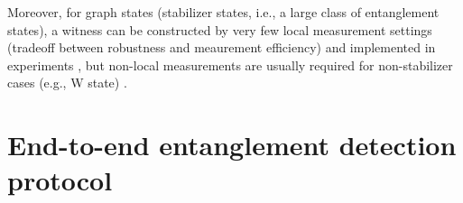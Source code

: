 \documentclass[
aps,
pra,
twocolumn,
floatfix,
]{revtex4-2}
\theoremstyle{plain}
\theoremstyle{definition}
\newcommand{\ew}{W}
\newcommand{\ghz}{\text{GHZ}}
\newcommand{\px}{X}
\newcommand{\pz}{Z}
\begin{document}
Moreover, for graph states (stabilizer states, i.e., a large class of entanglement states),
a witness can be constructed by very few local measurement settings (tradeoff between robustness and meaurement efficiency) \cite{tothDetectingGenuineMultipartite2005} \cite{tothEntanglementDetectionStabilizer2005} \cite{zhouDetectingMultipartiteEntanglement2019}
and implemented in experiments
\cite{luEntanglementStructureEntanglement2018}
\cite{zhouSchemeCreateVerify2022},
but non-local measurements are usually required for non-stabilizer cases (e.g., W state) \cite{zhangEfficientEntanglementGeneration2021} \cite{zhuMachineLearningDerivedEntanglement2021}.

\section{End-to-end entanglement detection protocol}\label{sec:protocol}
\end{document}
